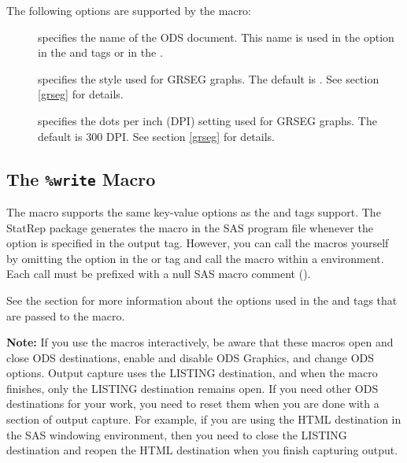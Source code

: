 \documentclass[article,oneside]{memoir}
\newcommand*{\StatRep}{\textsf{StatRep}\xspace}
\begin{document}
  The following options are supported by the  macro:
 \begin{description}
 \item[] specifies the name of the ODS document.
  This name is used in the  option in the  and  tags
  or in the .

 \item[] specifies the style used for GRSEG graphs.
 The default is . See section \ref{grseg} for details.

 \item[] specifies the dots per inch (DPI) setting used for GRSEG graphs.
  The default is 300 DPI. See section \ref{grseg} for details.
 \end{description}


  \subsection{The \texttt{\%write} Macro}
  The  macro supports the same key-value options as the  and
   tags support.
  The \StatRep package generates the  macro in the SAS program
  file whenever the  option is specified in the output tag.
  However, you can call the macros
  yourself by omitting the  option in the  or 
  tag and call the macro within a  environment. Each call must be prefixed
  with a null SAS macro comment (\Code{\%*;}).

See the section  for more information about the options used in the
 and  tags that are passed to the  macro.


\vspace*{1em}\noindent\textbf{Note:} If you use the macros interactively, be aware that
these macros open and close ODS destinations,
enable and disable ODS Graphics, and change ODS options.  Output capture uses the
LISTING destination, and when the  macro finishes, only the
LISTING destination remains open.
If you need other ODS destinations for your work, you need to reset them
when you are done with a section of output capture.  For example,
if you are using the HTML destination
in the SAS windowing environment, then you need to
close the LISTING destination and reopen the HTML destination when you finish
capturing output.
\end{document}
